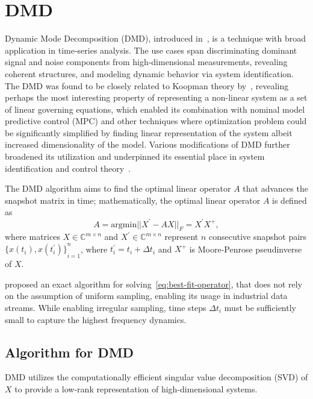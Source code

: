 \appendices

\section{DMD}\label{app:dmd}
Dynamic Mode Decomposition (DMD), introduced in~\cite{Schmid2010}, is a technique with broad application in time-series analysis. The use cases span discriminating dominant signal and noise components from high-dimensional measurements, revealing coherent structures, and modeling dynamic behavior via system identification. The DMD was found to be closely related to Koopman theory by~\cite{Rowley2009}, revealing perhaps the most interesting property of representing a non-linear system as a set of linear governing equations, which enabled its combination with nominal model predictive control (MPC) and other techniques where optimization problem could be significantly simplified by finding linear representation of the system albeit increased dimensionality of the model. Various modifications of DMD further broadened its utilization and underpinned its essential place in system identification and control theory~\cite{Schmid2022}.

The DMD algorithm aims to find the optimal linear operator \(A\) that advances the snapshot matrix in time; mathematically, the optimal linear operator \(A\) is defined as
\begin{equation}\label{eq:best-fit-operator}
    A = \mathrm{argmin} ||X^\prime - AX||_F = X^\prime X^+,
\end{equation}
where matrices \(X \in \mathbb{C}^{m \times n}\) and \(X^\prime \in \mathbb{C}^{m \times n}\) represent \(n\) consecutive snapshot pairs \({\{x(t_i), x(t_i^\prime )\}}^n_{i=1}\), where \(t_i^\prime = t_i + \Delta t_i\) and \(X^+\) is Moore-Penrose pseudinverse of \(X\).

\cite{Tu2013} proposed an exact algorithm for solving~\eqref{eq:best-fit-operator}, that does not rely on the assumption of uniform sampling, enabling its usage in industrial data streams. While enabling irregular sampling, time steps \(\Delta t_i\) must be sufficiently small to capture the highest frequency dynamics.

\subsection{Algorithm for DMD}
DMD utilizes the computationally efficient singular value decomposition (SVD) of \(X\) to provide a low-rank representation of high-dimensional systems.

